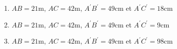 \documentclass[oneside,twoside]{book}
\begin{document}
\begin{enumerate}
\begin{enumerate}
\item\MauvaiseReponse $AB=21\mathrm{m}$, $AC=42\mathrm{m}$, $A^{\prime}B^{\prime}=49\mathrm{cm}$ et $A^{\prime}C^{\prime}=18\mathrm{cm}$

\item\MauvaiseReponse $AB=21\mathrm{m}$, $AC=42\mathrm{m}$, $A^{\prime}B^{\prime}=49\mathrm{cm}$ et $A^{\prime}C^{\prime}=9\mathrm{cm}$
\item\BonneReponse $AB=21\mathrm{m}$, $AC=42\mathrm{m}$, $A^{\prime}B^{\prime}=49\mathrm{cm}$ et $A^{\prime}C^{\prime}=98\mathrm{cm}$

\end{enumerate}


\end{enumerate}
\end{document}
